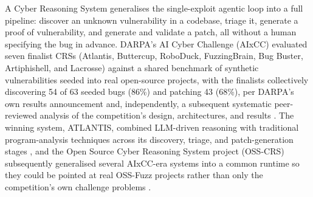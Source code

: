 \documentclass[12pt,a4paper]{report}
\begin{document}
A Cyber Reasoning System generalises the single-exploit agentic loop into a full pipeline: discover an unknown vulnerability in a codebase, triage it, generate a proof of vulnerability, and generate and validate a patch, all without a human specifying the bug in advance. DARPA's AI Cyber Challenge (AIxCC) evaluated seven finalist CRSs (Atlantis, Buttercup, RoboDuck, FuzzingBrain, Bug Buster, Artiphishell, and Lacrosse) against a shared benchmark of synthetic vulnerabilities seeded into real open-source projects, with the finalists collectively discovering 54 of 63 seeded bugs (86\%) and patching 43 (68\%), per DARPA's own results announcement and, independently, a subsequent systematic peer-reviewed analysis of the competition's design, architectures, and results \cite{aixcc,sokaixcc}. The winning system, ATLANTIS, combined LLM-driven reasoning with traditional program-analysis techniques across its discovery, triage, and patch-generation stages \cite{atlantis}, and the Open Source Cyber Reasoning System project (OSS-CRS) subsequently generalised several AIxCC-era systems into a common runtime so they could be pointed at real OSS-Fuzz projects rather than only the competition's own challenge problems \cite{osscrs}.
\end{document}
